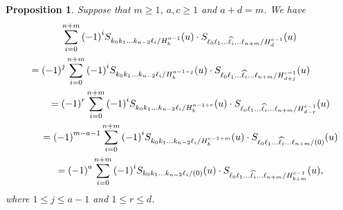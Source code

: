 \documentclass[10pt,a4paper]{amsart}
\numberwithin{equation}{section}
\newtheorem{Proposition}[Theorem]{Proposition}
 { \theoremstyle{definition}
\newtheorem{Definition}[Theorem]{Definition}
\newtheorem{Note}[Theorem]{Note}
\newtheorem{Example}[Theorem]{Example}
\newtheorem{Remark}[Theorem]{Remark} }
\begin{document}
\begin{Proposition}\label{mabcd}
Suppose that $m\geq 1$, $a,c\geq 1$ and $a+d=m$. We have
\begin{gather}
\sum_{i=0}^{n+m}{(-1)}^{i}S_{k_0 k_1\dots k_{n-2}\ell_i/{H^{a-1}_{b}}}(u)\cdot S_{\ell_0 \ell_1\dots \widehat{\ell_{i}}\dots\ell_{n+m}/{H^{c-1}_{d}}}(u)\label{mabcd0}\\
\qquad{}={(-1)}^{j}\sum_{i=0}^{n+m}{(-1)}^{i}S_{k_0 k_1\dots k_{n-2}\ell_i/{H^{a-1-j}_{b}}}(u)\cdot S_{\ell_0 \ell_1\dots \widehat{\ell_{i}}\dots\ell_{n+m}/{H^{c-1}_{d+j}}}(u)\hspace{0.5cm}\ \ \ \ \ \ \ \ \label{mabcd1}\\
\qquad{}={(-1)}^{r}\sum_{i=0}^{n+m}{(-1)}^{i}S_{k_0 k_1\dots k_{n-2}\ell_i/{H^{a-1+r}_{b}}}(u)\cdot S_{\ell_0 \ell_1\dots \widehat{\ell_{i}}\dots\ell_{n+m}/{H^{c-1}_{d-r}}}(u) \label{mabcd2}\\
\qquad{}={(-1)}^{m-a-1}\sum_{i=0}^{n+m}{(-1)}^{i}S_{k_0 k_1\dots k_{n-2}\ell_i/{H^{c-1+m}_{b}}}(u)\cdot S_{\ell_0 \ell_1\dots \widehat{\ell_{i}}\dots\ell_{n+m}/{(0)}}(u)
\label{mabcd3}\\
\qquad{}={(-1)}^{a}\sum_{i=0}^{n+m}{(-1)}^{i}S_{k_0 k_1\dots k_{n-2}\ell_i/{(0)}}(u)\cdot S_{\ell_0 \ell_1\dots \widehat{\ell_{i}}\dots\ell_{n+m}/{H^{c-1}_{b+m}}}(u),
\label{mabcd4}
\end{gather}
where $1\leq j \leq a-1$ and $1\leq r\leq d$.
\end{Proposition}
\end{document}

